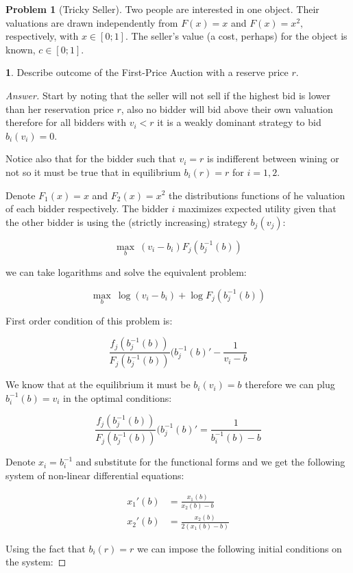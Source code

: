 \documentclass[12pt]{article}
\theoremstyle{definition}
\newtheorem{problem}{Problem}
\newtheorem{subproblem}{}[problem]
\begin{document}
\begin{problem}[Tricky Seller]
Two people are interested in one object. Their valuations are drawn independently from $F(x)=x$ and $F(x)=x^{2},$ respectively, with $x \in[0 ; 1] .$ The seller's value (a cost, perhaps) for the object is known, $c \in[0 ; 1]$.
\begin{subproblem}
Describe outcome of the First-Price Auction with a reserve price $r$.
\end{subproblem}
\begin{proof}[Answer]
Start by noting that the seller will not sell if the highest bid is lower than her reservation price $r$, also no bidder will bid above their own valuation therefore for all bidders with $v_i<r$ it is a weakly dominant strategy to bid $b_i(v_i) = 0$.

Notice also that for the bidder such that $v_i=r$ is indifferent between wining or not so it must be true that in equilibrium $b_i(r)=r$ for $i=1,2$.

Denote $F_1(x)=x$ and $F_2(x) = x^2$ the distributions functions of he valuation of each bidder respectively. The bidder $i$ maximizes expected utility given that the other bidder is using the (strictly increasing) strategy $b_j(v_j)$:

$$\max_{b}\:(v_i-b_i)F_j(b_j^{-1}(b))$$

we can take logarithms and solve the equivalent problem:

$$\max_{b}\:\log{(v_i-b_i)} + \log{F_j(b_j^{-1}(b))}$$

First order condition of this problem is:

$$\frac{f_j(b_j^{-1}(b))}{F_j(b_j^{-1}(b))}(b_j^{-1}(b)' - \frac{1}{v_i - b}$$

We know that at the equilibrium it must be $b_i(v_i) = b$ therefore we can plug $b_i^{-1}(b) = v_i$ in the optimal conditions:

$$\frac{f_j(b_j^{-1}(b))}{F_j(b_j^{-1}(b))}(b_j^{-1}(b)' = \frac{1}{b_i^{-1}(b) - b}$$

Denote $x_i = b_i^{-1}$ and substitute for the functional forms and we get the following system of non-linear differential equations:

\begin{align*}
x_1'(b) &= \frac{x_1(b)}{x_2(b)-b} \\    
 x_2'(b) &= \frac{x_2(b)}{2(x_1(b)-b)} 
\end{align*}


Using the fact that $b_i(r)=r$ we can impose the following initial conditions on the system:


\end{proof}
\end{problem}
\end{document}
